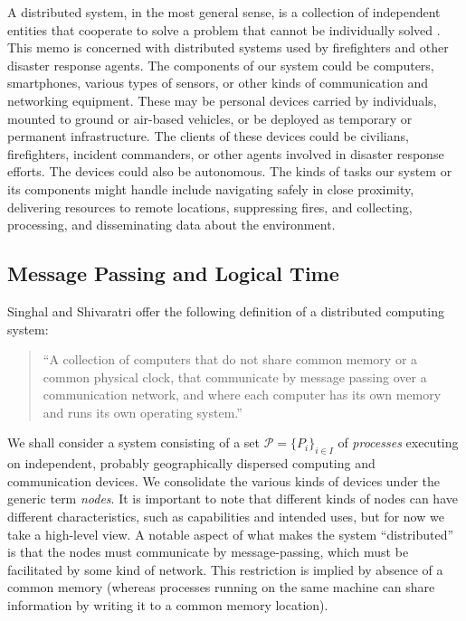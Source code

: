 \documentclass[]             %
{NASA}                       %
\theoremstyle{definition}
\begin{document}
A distributed system, in the most general sense, is a collection of
independent entities that cooperate to solve a problem that cannot be
individually solved \cite{kshemkalyani_singhal_2008}. This memo is
concerned with distributed systems used by firefighters and other
disaster response agents. The components of our system could be
computers, smartphones, various types of sensors, or other kinds of
communication and networking equipment. These may be personal devices
carried by individuals, mounted to ground or air-based vehicles, or be
deployed as temporary or permanent infrastructure. The clients of
these devices could be civilians, firefighters, incident commanders,
or other agents involved in disaster response efforts. The devices
could also be autonomous. The kinds of tasks our system or its
components might handle include navigating safely in close proximity,
delivering resources to remote locations, suppressing fires, and
collecting, processing, and disseminating data about the environment.

\subsection{Message Passing and Logical Time}
\label{ssec:message-passing}

Singhal and Shivaratri \cite{10.5555/562065} offer the following
definition of a distributed computing system:

\begin{quote}
  ``A collection of computers that do not share common memory or a common
  physical clock, that communicate by message passing over a communication
  network, and where each computer has its own memory and runs its own
  operating system.''
\end{quote}
We shall consider a system consisting of a set \(\mathcal{P} =
\{P_i\}_{i\in I}\) of \emph{processes} executing on independent,
probably geographically dispersed computing and communication
devices. We consolidate the various kinds of devices under the generic
term \emph{nodes}. It is important to note that different kinds of
nodes can have different characteristics, such as capabilities and
intended uses, but for now we take a high-level view. A notable aspect
of what makes the system ``distributed'' is that the nodes must
communicate by message-passing, which must be facilitated by some kind
of network. This restriction is implied by absence of a common memory
(whereas processes running on the same machine can share information
by writing it to a common memory location).
\end{document}
